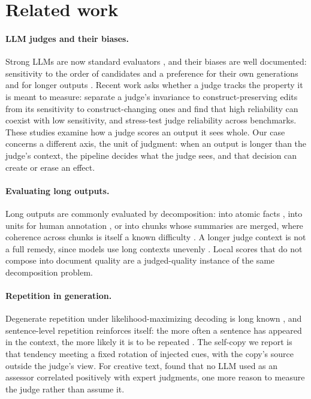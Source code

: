 \documentclass[11pt]{article}
\begin{document}
\section{Related work}

\paragraph{LLM judges and their biases.} Strong LLMs are now standard
evaluators \citep{zheng2023judging,liu2023geval,chiang2023alternative}, and
their biases are well documented: sensitivity to the order of candidates
\citep{wang2023fair} and a preference for their own generations
\citep{panickssery2024selfpref} and for longer outputs
\citep{dubois2024lengthcontrolled}. Recent work asks whether a judge tracks
the property it is meant to measure: \citet{chen2026construct} separate a
judge's invariance to construct-preserving edits from its sensitivity to
construct-changing ones and find that high reliability can coexist with low
sensitivity, and \citet{dev2026harness} stress-test judge reliability across
benchmarks. These studies examine how a judge scores an output it sees
whole. Our case concerns a different axis, the unit of judgment: when an
output is longer than the judge's context, the pipeline decides what the
judge sees, and that decision can create or erase an effect.

\paragraph{Evaluating long outputs.} Long outputs are commonly evaluated by
decomposition: into atomic facts \citep{min2023factscore}, into units for
human annotation \citep{krishna2023longeval}, or into chunks whose summaries
are merged, where coherence across chunks is itself a known difficulty
\citep{chang2023booookscore}. A longer judge context is not a full remedy,
since models use long contexts unevenly \citep{liu2023lost}. Local scores
that do not compose into document quality are a judged-quality instance of
the same decomposition problem.

\paragraph{Repetition in generation.} Degenerate repetition under
likelihood-maximizing decoding is long known
\citep{holtzman2020curious,welleck2019unlikelihood}, and sentence-level
repetition reinforces itself: the more often a sentence has appeared in the
context, the more likely it is to be repeated \citep{xu2022loop}. The
self-copy we report is that tendency meeting a fixed rotation of injected
cues, with the copy's source outside the judge's view. For creative text,
\citet{chakrabarty2023artifice} found that no LLM used as an assessor
correlated positively with expert judgments, one more reason to measure the
judge rather than assume it.
\end{document}
